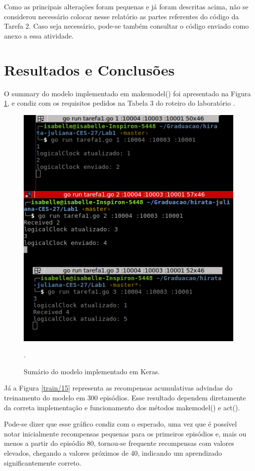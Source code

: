 \documentclass[conference]{IEEEtran}
\begin{document}
Como as principais alterações foram pequenas e já foram descritas acima, não se considerou necessário colocar nesse relatório as partes referentes do código da Tarefa 2. Caso seja necessário, pode-se também consultar o código enviado como anexo a essa atividade. 

\section{Resultados e Conclusões} \label{results}

	O summary do modelo implementado em make\underline{\space}model() foi apresentado na Figura \ref{summary}, e condiz com os requisitos pedidos na Tabela 3 do roteiro do laboratório \cite{roteiro}. 

\begin{figure}[htbp]
\centering
\centerline{\includegraphics[scale=0.5]{imagens/tarefa1-testeslide.png}}
\caption{Sumário do modelo implementado em Keras.}.
\label{summary}
\end{figure}

	Já a Figura \ref{train/15} representa as recompensas acumulativas advindas do treinamento do modelo em 300 episódios. Esse resultado dependem diretamente da correta implementação e funcionamento dos métodos make\underline{\space}model() e act().
	
	Pode-se dizer que esse gráfico condiz com o esperado, uma vez que é possível notar inicialmente recompensas pequenas para os primeiros episódios e, mais ou menos a partir do episódio 80, tornou-se frequente recompensas com valores elevados, chegando a valores próximos de 40, indicando um aprendizado significantemente correto.
\end{document}
